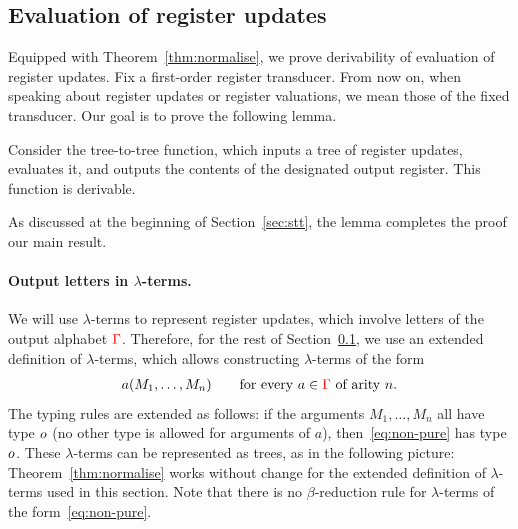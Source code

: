 \subsection{Evaluation of register updates}
\label{sec:updates-endgame}
Equipped with Theorem~\ref{thm:normalise}, we  prove derivability of  evaluation of  register updates. 
Fix a first-order register transducer.
From now on, when speaking about register updates or register valuations, we mean those of the fixed transducer. 
Our goal is to prove the following lemma. 
\begin{lemma}\label{lem:derive-register-updates}
    Consider
    the   tree-to-tree function, which inputs a tree of  register updates, evaluates it, and outputs the  contents of the designated output register. This function is derivable. 
\end{lemma}As discussed at the beginning of  Section~\ref{sec:stt}, the lemma completes the proof  our main result. 

\paragraph*{Output letters in $\lambda$-terms.} We will   use $\lambda$-terms to represent register updates, which involve letters of the output alphabet ${\color{red}{\Gamma}}$. Therefore, for the  rest of Section~\ref{sec:updates-endgame}, we use an extended definition of $\lambda$-terms, which allows  constructing $\lambda$-terms of the form 
\begin{align}\label{eq:non-pure}
a(M_1,\ldots,M_n) \qquad \text{for every $a \in {\color{red}{\Gamma}}$ of arity $n$.}
\end{align}
The typing rules are extended as follows: if the arguments $M_1,\ldots,M_n$ all have type $o$ (no other type is allowed for arguments of $a$),  then~\eqref{eq:non-pure} has type $o$. These $\lambda$-terms can  be represented as trees, as in the following picture:
Theorem~\ref{thm:normalise} works without change for the extended definition of  $\lambda$-terms used in this section. Note that there is no $\beta$-reduction rule for $\lambda$-terms of the form~\eqref{eq:non-pure}.


